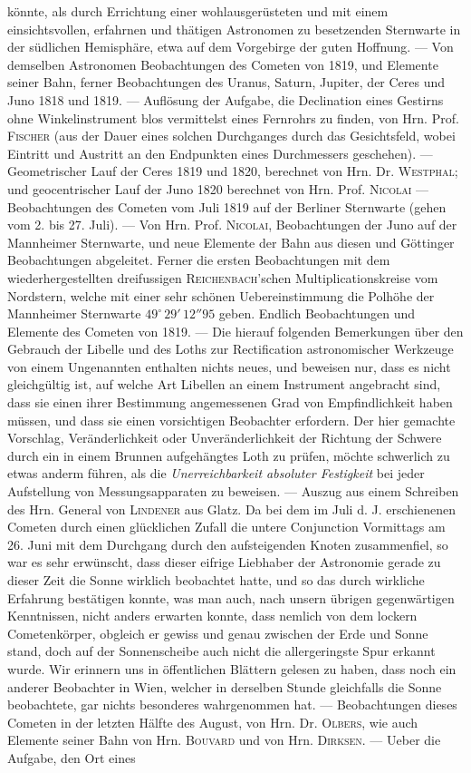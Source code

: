 könnte, als durch Errichtung einer wohlausgerüsteten und mit einem einsichtsvollen, erfahrnen und thätigen Astronomen zu besetzenden Sternwarte in der südlichen Hemisphäre, etwa auf dem Vorgebirge der guten Hoffnung. --- Von demselben Astronomen Beobachtungen des Cometen von 1819, und Elemente seiner Bahn, ferner Beobachtungen des Uranus, Saturn, Jupiter, der Ceres und Juno 1818 und 1819. --- Auflösung der Aufgabe, die Declination eines Gestirns ohne Winkelinstrument blos vermittelst eines Fernrohrs zu finden, von Hrn. Prof. \textsc{Fischer} (aus der Dauer eines solchen Durchganges durch das Gesichtsfeld, wobei Eintritt und Austritt an den Endpunkten eines Durchmessers geschehen). --- Geometrischer Lauf der Ceres 1819 und 1820, berechnet von Hrn. Dr. \textsc{Westphal}; und geocentrischer Lauf der Juno 1820 berechnet von Hrn. Prof. \textsc{Nicolai} --- Beobachtungen des Cometen vom Juli 1819 auf der Berliner Sternwarte (gehen vom 2. bis 27. Juli). --- Von Hrn. Prof. \textsc{Nicolai}, Beobachtungen der Juno auf der Mannheimer Sternwarte, und neue Elemente der Bahn aus diesen und Göttinger Beobachtungen abgeleitet. Ferner die ersten Beobachtungen mit dem wiederhergestellten dreifussigen \textsc{Reichenbach}'schen Multiplicationskreise vom Nordstern, welche mit einer sehr schönen Uebereinstimmung die Polhöhe der Mannheimer Sternwarte $49^\circ\,29'\,12''95$ geben. Endlich Beobachtungen und Elemente des Cometen von 1819. --- Die hierauf folgenden Bemerkungen über den Gebrauch der Libelle und des Loths zur Rectification astronomischer Werkzeuge von einem Ungenannten enthalten nichts neues, und beweisen nur, dass es nicht gleichgültig ist, auf welche Art Libellen an einem Instrument angebracht sind, dass sie einen ihrer Bestimmung angemessenen Grad von Empfindlichkeit haben müssen, und dass sie einen vorsichtigen Beobachter erfordern. Der hier gemachte Vorschlag, Veränderlichkeit oder Unveränderlichkeit der Richtung der Schwere durch ein in einem Brunnen aufgehängtes Loth zu prüfen, möchte schwerlich zu etwas anderm führen, als die \emph{Unerreichbarkeit absoluter Festigkeit} bei jeder Aufstellung von Messungsapparaten zu beweisen. --- Auszug aus einem Schreiben des Hrn. General von \textsc{Lindener} aus Glatz. Da bei dem im Juli d. J. erschienenen Cometen durch einen glücklichen Zufall die untere Conjunction Vormittags am 26. Juni mit dem Durchgang durch den aufsteigenden Knoten zusammenfiel, so war es sehr erwünscht, dass dieser eifrige Liebhaber der Astronomie gerade zu dieser Zeit die Sonne wirklich beobachtet hatte, und so das durch wirkliche Erfahrung  bestätigen konnte, was man auch, nach unsern übrigen gegenwärtigen Kenntnissen, nicht anders erwarten konnte, dass nemlich von dem lockern Cometenkörper, obgleich er gewiss und genau zwischen der Erde und Sonne stand, doch auf der Sonnenscheibe auch nicht die allergeringste Spur erkannt wurde. Wir erinnern uns in öffentlichen Blättern gelesen zu haben, dass noch ein anderer Beobachter in Wien, welcher in derselben Stunde gleichfalls die Sonne beobachtete, gar nichts besonderes wahrgenommen hat. --- Beobachtungen dieses Cometen in der letzten Hälfte des August, von Hrn. Dr. \textsc{Olbers}, wie auch Elemente seiner Bahn von Hrn. \textsc{Bouvard} und von Hrn. \textsc{Dirksen}. --- Ueber die Aufgabe, den Ort eines 